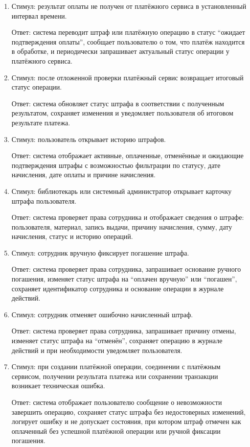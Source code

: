 \documentclass[12pt,a4paper]{article}
\begin{document}
\begin{enumerate}
		\item Стимул: результат оплаты не получен от платёжного сервиса в установленный
		интервал времени.
		
		Ответ: система переводит штраф или платёжную операцию в статус ``ожидает
		подтверждения оплаты'', сообщает пользователю о том, что платёж находится
		в обработке, и периодически запрашивает актуальный статус операции у платёжного
		сервиса.
		
		\item Стимул: после отложенной проверки платёжный сервис возвращает итоговый
		статус операции.
		
		Ответ: система обновляет статус штрафа в соответствии с полученным результатом,
		сохраняет изменения и уведомляет пользователя об итоговом результате платежа.
		
		\item Стимул: пользователь открывает историю штрафов.
		
		Ответ: система отображает активные, оплаченные, отменённые и ожидающие
		подтверждения штрафы с возможностью фильтрации по статусу, дате начисления,
		дате оплаты и причине начисления.
		
		\item Стимул: библиотекарь или системный администратор открывает карточку
		штрафа пользователя.
		
		Ответ: система проверяет права сотрудника и отображает сведения о штрафе:
		пользователя, материал, запись выдачи, причину начисления, сумму, дату
		начисления, статус и историю операций.
		
		\item Стимул: сотрудник вручную фиксирует погашение штрафа.
		
		Ответ: система проверяет права сотрудника, запрашивает основание ручного
		погашения, изменяет статус штрафа на ``оплачен вручную'' или ``погашен'',
		сохраняет идентификатор сотрудника и основание операции в журнале действий.
		
		\item Стимул: сотрудник отменяет ошибочно начисленный штраф.
		
		Ответ: система проверяет права сотрудника, запрашивает причину отмены,
		изменяет статус штрафа на ``отменён'', сохраняет операцию в журнале действий
		и при необходимости уведомляет пользователя.
		
		\item Стимул: при создании платёжной операции, соединении с платёжным сервисом,
		получении результата платежа или сохранении транзакции возникает техническая
		ошибка.
		
		Ответ: система отображает пользователю сообщение о невозможности завершить
		операцию, сохраняет статус штрафа без недостоверных изменений, логирует ошибку
		и не допускает состояния, при котором штраф отмечен как оплаченный без успешной
		платёжной операции или ручной фиксации погашения.
	\end{enumerate}
	
\end{document}
